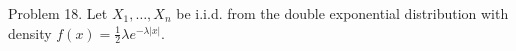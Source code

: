\documentclass[preview]{standalone}
\begin{document}
\begin{center}
Problem 18. Let $X_1,\dots,X_n$ be i.i.d. from the double exponential distribution with density $f(x)=\tfrac12\lambda e^{-\lambda|x|}$.
\end{center}
\end{document}
